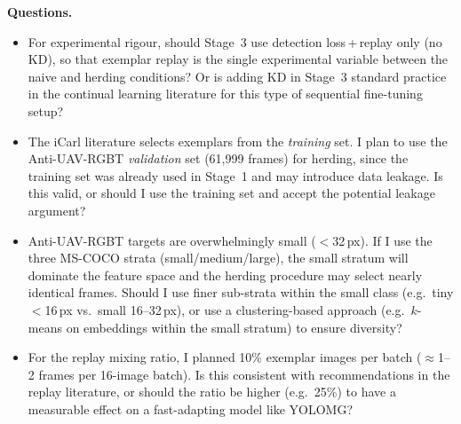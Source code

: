 \textbf{Questions.}
\begin{itemize}
    \item For experimental rigour, should Stage~3 use
          detection loss\,+\,replay only (no KD), so that
          exemplar replay is the single experimental variable
          between the naive and herding conditions? Or is
          adding KD in Stage~3 standard practice in the
          continual learning literature for this type of
          sequential fine-tuning setup?

    \item The iCarl literature selects exemplars from the
          \emph{training} set. I plan to use the Anti-UAV-RGBT
          \emph{validation} set (61,999 frames) for herding,
          since the training set was already used in Stage~1
          and may introduce data leakage. Is this valid, or
          should I use the training set and accept the
          potential leakage argument?

    \item Anti-UAV-RGBT targets are overwhelmingly small
          ($<$32\,px). If I use the three MS-COCO strata
          (small/medium/large), the small stratum will dominate
          the feature space and the herding procedure may
          select nearly identical frames. Should I use finer
          sub-strata within the small class (e.g.\ tiny $<$16\,px
          vs.\ small 16--32\,px), or use a clustering-based
          approach (e.g.\ $k$-means on embeddings within the
          small stratum) to ensure diversity?

    \item For the replay mixing ratio, I planned 10\% exemplar
          images per batch ($\approx$1--2 frames per 16-image
          batch). Is this consistent with recommendations in
          the replay literature, or should the ratio be higher
          (e.g.\ 25\%) to have a measurable effect on a
          fast-adapting model like YOLOMG?
\end{itemize}
